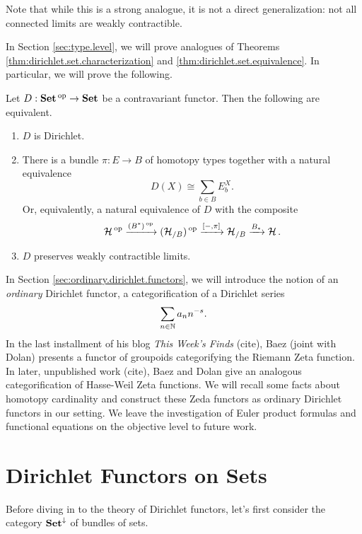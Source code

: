 Note that while this is a strong analogue, it is not a direct generalization:
not all connected limits are weakly contractible.

In Section \ref{sec:type.level}, we will prove analogues of Theorems
\ref{thm:dirichlet.set.characterization} and
\ref{thm:dirichlet.set.equivalence}. In particular, we will prove the following.

\begin{thm}\label{thm:dirichlet.type.characterization}
Let $D : \operatorname{\textbf{Set}}\operatorname{^\text{op}} \to \operatorname{\textbf{Set}}$ be a contravariant functor. Then the following are
equivalent.
\begin{enumerate}
\item $D$ is Dirichlet.
\item There is a bundle $\pi : E \to B$ of homotopy types together with a natural equivalence
  $$D(X) \cong \sum_{b \in B} E_b^X.$$
  Or, equivalently, a natural equivalence of $D$ with the composite
  $$\operatorname{\mathcal{H}}\operatorname{^\text{op}} \xrightarrow{(B^{\ast})\operatorname{^\text{op}}} (\operatorname{\mathcal{H}}_{/B})\operatorname{^\text{op}} \xrightarrow{[-, \pi]} \operatorname{\mathcal{H}}_{/B}
  \xrightarrow{B_{\ast}} \operatorname{\mathcal{H}}.$$
\item $D$ preserves weakly contractible limits.
\end{enumerate}
\end{thm}

In Section \ref{sec:ordinary.dirichlet.functors}, we will introduce the notion
of an \emph{ordinary} Dirichlet functor, a categorification of a Dirichlet
series
$$\sum_{n \in \operatorname{\mathbb{N}}} a_n n^{-s}.$$
In the last installment of his blog \emph{This Week's Finds} (cite), Baez (joint with
Dolan) presents a functor of groupoids categorifying the Riemann Zeta function.
In later, unpublished work (cite), Baez and Dolan give an analogous
categorification of Hasse-Weil Zeta functions. We will recall some facts about
homotopy cardinality and construct these Zeda functors as ordinary Dirichlet
functors in our setting. We leave the investigation of Euler product formulas
and functional equations on the objective level to future work.

\begin{acknowledgements}

\end{acknowledgements}


\section{Dirichlet Functors on Sets} \label{sec:set.level}

Before diving in to the theory of Dirichlet functors, let's first consider the
category $\operatorname{\textbf{Set}}^{\mathbin{\downarrow}}$ of bundles of sets.

